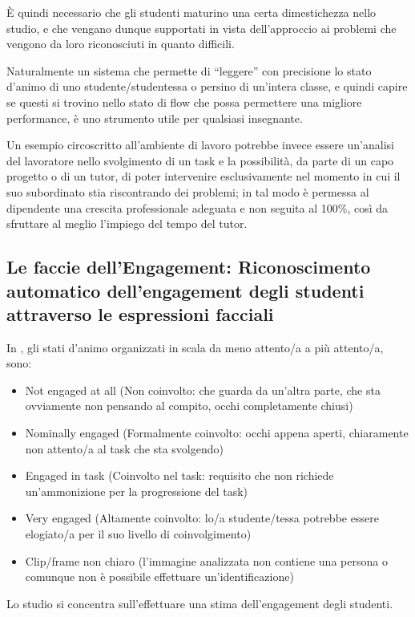 È quindi necessario che gli studenti maturino una certa dimestichezza nello studio, e che vengano dunque supportati in vista dell’approccio ai problemi che vengono da loro riconosciuti in quanto difficili.

Naturalmente un sistema che permette di “leggere” con precisione lo stato d’animo di uno studente/studentessa o persino di un’intera classe, e quindi capire se questi si trovino nello stato di flow che possa permettere una migliore performance, è uno strumento utile per qualsiasi insegnante.

Un esempio circoscritto all’ambiente di lavoro potrebbe invece essere un’analisi del lavoratore nello svolgimento di un task e la possibilità, da parte di un capo progetto o di un tutor, di poter intervenire esclusivamente nel momento in cui il suo subordinato stia riscontrando dei problemi; in tal modo è permessa al dipendente una crescita professionale adeguata e non seguita al 100\%, così da sfruttare al meglio l’impiego del tempo del tutor.

\subsection {Le faccie dell'Engagement: Riconoscimento automatico dell'engagement degli studenti attraverso le espressioni facciali}

In \cite{FacesOfEngagement}, gli stati d’animo organizzati in scala da meno attento/a a più attento/a, sono:
\begin{itemize}
    \item Not engaged at all (Non coinvolto: che guarda da un’altra parte, che sta ovviamente non pensando al compito, occhi completamente chiusi)
    \item Nominally engaged (Formalmente coinvolto: occhi appena aperti, chiaramente non attento/a al task che sta svolgendo)
    \item Engaged in task (Coinvolto nel task: requisito che non richiede un’ammonizione per la progressione del task)
    \item Very engaged (Altamente coinvolto: lo/a studente/tessa potrebbe essere elogiato/a per il suo livello di coinvolgimento)
    \item Clip/frame non chiaro (l’immagine analizzata non contiene una persona o comunque non è possibile effettuare un’identificazione)
\end{itemize}

Lo studio si concentra sull’effettuare una stima dell’engagement degli studenti. 

